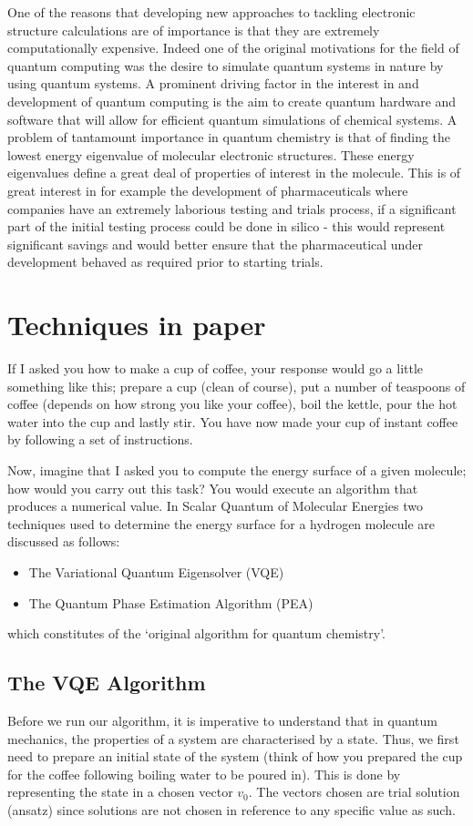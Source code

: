 \documentclass[12pt]{article}
\begin{document}
One of the reasons that developing new approaches to tackling electronic structure calculations are of importance is that they are extremely computationally expensive. Indeed one of the original motivations for the field of quantum computing was the desire to simulate quantum systems in nature by using quantum systems. A prominent driving factor in the interest in and development of quantum computing is the aim to create quantum hardware and software that will allow for efficient quantum simulations of chemical systems. A problem of tantamount importance in quantum chemistry is that of finding the lowest energy eigenvalue of molecular electronic structures. These energy eigenvalues define a great deal of properties of interest in the molecule. This is of great interest in for example the development of pharmaceuticals where companies have an extremely laborious testing and trials process, if a significant part of the initial testing process could be done in silico - this would represent significant savings and would better ensure that the pharmaceutical under development behaved as required prior to starting trials.
\section{Techniques in paper}
If I asked you how to make a cup of coffee, your response would go a little something like this; prepare a cup (clean of course), put a number of teaspoons of coffee (depends on how strong you like your coffee), boil the kettle, pour the hot water into the cup and lastly stir. You have now made your cup of instant coffee by following a set of instructions.
 
Now, imagine that I asked you to compute the energy surface of a given molecule; how would you carry out this task? You would execute an algorithm that produces a numerical value. In Scalar Quantum of Molecular Energies two techniques used to determine the energy surface for a hydrogen molecule are discussed as follows: 
\begin{itemize}
\item The Variational Quantum Eigensolver (VQE)
\item The Quantum Phase Estimation Algorithm (PEA)
\end{itemize}
which constitutes of the ‘original algorithm for quantum chemistry’.

\subsection{The VQE Algorithm}
Before we run our algorithm, it is imperative to understand that in quantum mechanics, the properties of a system are characterised by a state. Thus, we first need to prepare an initial state of the system (think of how you prepared the cup for the coffee following boiling water to be poured in). This is done by representing the state in a chosen vector $v_0$. The vectors chosen are trial solution (ansatz) since solutions are not chosen in reference to any specific value as such.
 
\end{document}
